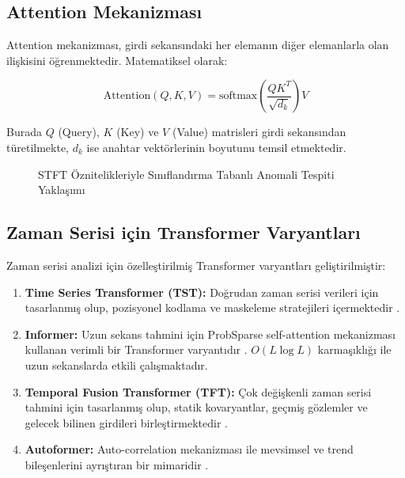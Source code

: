 \subsection{Attention Mekanizması}

Attention mekanizması, girdi sekansındaki her elemanın diğer elemanlarla olan ilişkisini öğrenmektedir. Matematiksel olarak:

\begin{equation}
\text{Attention}(Q, K, V) = \text{softmax}\left(\frac{QK^T}{\sqrt{d_k}}\right)V
\end{equation}

Burada $Q$ (Query), $K$ (Key) ve $V$ (Value) matrisleri girdi sekansından türetilmekte, $d_k$ ise anahtar vektörlerinin boyutunu temsil etmektedir.

\begin{figure}[htbp]
    \centering
    \caption{STFT Öznitelikleriyle Sınıflandırma Tabanlı Anomali Tespiti Yaklaşımı}
    \label{fig:ml_anomaly_pipeline}
\end{figure}

\subsection{Zaman Serisi için Transformer Varyantları}

Zaman serisi analizi için özelleştirilmiş Transformer varyantları geliştirilmiştir:

\begin{enumerate}
    \item \textbf{Time Series Transformer (TST):} Doğrudan zaman serisi verileri için tasarlanmış olup, pozisyonel kodlama ve maskeleme stratejileri içermektedir \cite{li2019enhancing}.
    
    \item \textbf{Informer:} Uzun sekans tahmini için ProbSparse self-attention mekanizması kullanan verimli bir Transformer varyantıdır \cite{zhou2021informer}. $O(L \log L)$ karmaşıklığı ile uzun sekanslarda etkili çalışmaktadır.
    
    \item \textbf{Temporal Fusion Transformer (TFT):} Çok değişkenli zaman serisi tahmini için tasarlanmış olup, statik kovaryantlar, geçmiş gözlemler ve gelecek bilinen girdileri birleştirmektedir \cite{lim2021temporal}.
    
    \item \textbf{Autoformer:} Auto-correlation mekanizması ile mevsimsel ve trend bileşenlerini ayrıştıran bir mimaridir \cite{wu2021autoformer}.
\end{enumerate}

